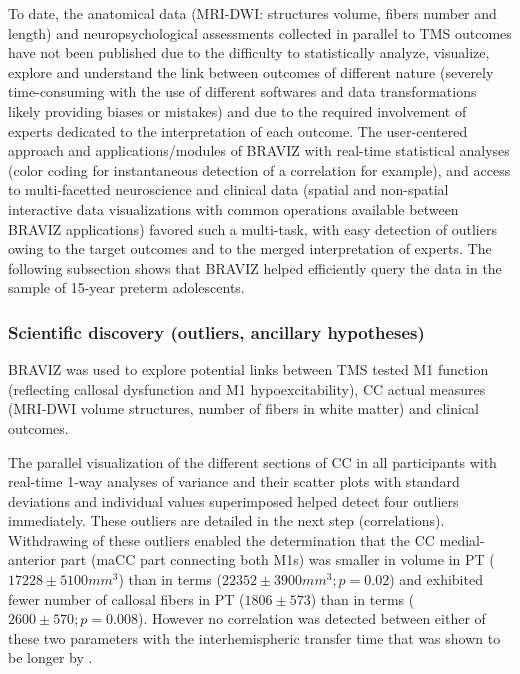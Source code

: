 \documentclass{frontiersHLTH}
\begin{document}
To date, the anatomical data (MRI-DWI: structures volume, fibers number and length) and neuropsychological assessments collected in parallel to TMS outcomes have not been published due to the difficulty to statistically analyze, visualize, explore and understand the link between outcomes of different nature (severely time-consuming with the use of different softwares and data transformations likely providing biases or mistakes) and due to the required involvement of experts dedicated to the interpretation of each outcome. The user-centered approach and applications/modules of BRAVIZ with real-time statistical analyses (color coding for instantaneous detection of a correlation for example), and access to multi-facetted neuroscience and clinical data (spatial and non-spatial interactive data visualizations with common operations available between BRAVIZ applications) favored such a multi-task, with easy detection of outliers owing to the target outcomes and to the merged interpretation of experts. The following subsection shows that BRAVIZ helped efficiently query the data in the sample of 15-year preterm adolescents.

\subsubsection{Scientific discovery (outliers, ancillary hypotheses)}

BRAVIZ was used to explore potential links between TMS tested M1 function (reflecting callosal dysfunction and M1 hypoexcitability), CC actual measures (MRI-DWI volume structures, number of fibers in white matter) and clinical outcomes. 

The parallel visualization of the different sections of CC in all participants with real-time 1-way analyses of variance and their scatter plots with standard deviations and individual values superimposed helped detect four outliers immediately. These outliers are detailed in the next step (correlations). Withdrawing of these outliers enabled the determination that the CC medial-anterior part (maCC part connecting both M1s) was smaller in volume in PT ($17228 \pm 5100 mm^3$) than in terms ($22352 \pm 3900 mm^3; p=0.02$) and exhibited fewer number of callosal fibers in PT ($1806 \pm 573$) than in terms ($2600 \pm 570; p=0.008$). However no correlation was detected between either of these two parameters with the interhemispheric transfer time that was shown to be longer by \cite{schneider_cerebral_2012}. 

\end{document}
